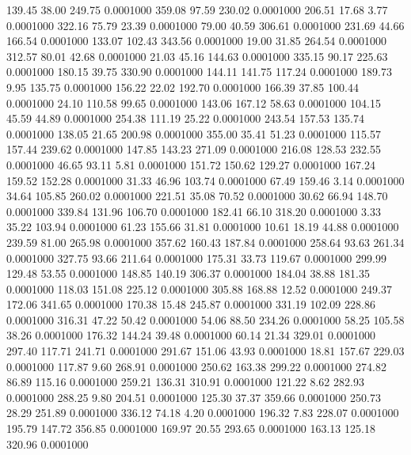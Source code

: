  139.45   38.00  249.75   0.0001000
 359.08   97.59  230.02   0.0001000
 206.51   17.68    3.77   0.0001000
 322.16   75.79   23.39   0.0001000
  79.00   40.59  306.61   0.0001000
 231.69   44.66  166.54   0.0001000
 133.07  102.43  343.56   0.0001000
  19.00   31.85  264.54   0.0001000
 312.57   80.01   42.68   0.0001000
  21.03   45.16  144.63   0.0001000
 335.15   90.17  225.63   0.0001000
 180.15   39.75  330.90   0.0001000
 144.11  141.75  117.24   0.0001000
 189.73    9.95  135.75   0.0001000
 156.22   22.02  192.70   0.0001000
 166.39   37.85  100.44   0.0001000
  24.10  110.58   99.65   0.0001000
 143.06  167.12   58.63   0.0001000
 104.15   45.59   44.89   0.0001000
 254.38  111.19   25.22   0.0001000
 243.54  157.53  135.74   0.0001000
 138.05   21.65  200.98   0.0001000
 355.00   35.41   51.23   0.0001000
 115.57  157.44  239.62   0.0001000
 147.85  143.23  271.09   0.0001000
 216.08  128.53  232.55   0.0001000
  46.65   93.11    5.81   0.0001000
 151.72  150.62  129.27   0.0001000
 167.24  159.52  152.28   0.0001000
  31.33   46.96  103.74   0.0001000
  67.49  159.46    3.14   0.0001000
  34.64  105.85  260.02   0.0001000
 221.51   35.08   70.52   0.0001000
  30.62   66.94  148.70   0.0001000
 339.84  131.96  106.70   0.0001000
 182.41   66.10  318.20   0.0001000
   3.33   35.22  103.94   0.0001000
  61.23  155.66   31.81   0.0001000
  10.61   18.19   44.88   0.0001000
 239.59   81.00  265.98   0.0001000
 357.62  160.43  187.84   0.0001000
 258.64   93.63  261.34   0.0001000
 327.75   93.66  211.64   0.0001000
 175.31   33.73  119.67   0.0001000
 299.99  129.48   53.55   0.0001000
 148.85  140.19  306.37   0.0001000
 184.04   38.88  181.35   0.0001000
 118.03  151.08  225.12   0.0001000
 305.88  168.88   12.52   0.0001000
 249.37  172.06  341.65   0.0001000
 170.38   15.48  245.87   0.0001000
 331.19  102.09  228.86   0.0001000
 316.31   47.22   50.42   0.0001000
  54.06   88.50  234.26   0.0001000
  58.25  105.58   38.26   0.0001000
 176.32  144.24   39.48   0.0001000
  60.14   21.34  329.01   0.0001000
 297.40  117.71  241.71   0.0001000
 291.67  151.06   43.93   0.0001000
  18.81  157.67  229.03   0.0001000
 117.87    9.60  268.91   0.0001000
 250.62  163.38  299.22   0.0001000
 274.82   86.89  115.16   0.0001000
 259.21  136.31  310.91   0.0001000
 121.22    8.62  282.93   0.0001000
 288.25    9.80  204.51   0.0001000
 125.30   37.37  359.66   0.0001000
 250.73   28.29  251.89   0.0001000
 336.12   74.18    4.20   0.0001000
 196.32    7.83  228.07   0.0001000
 195.79  147.72  356.85   0.0001000
 169.97   20.55  293.65   0.0001000
 163.13  125.18  320.96   0.0001000
